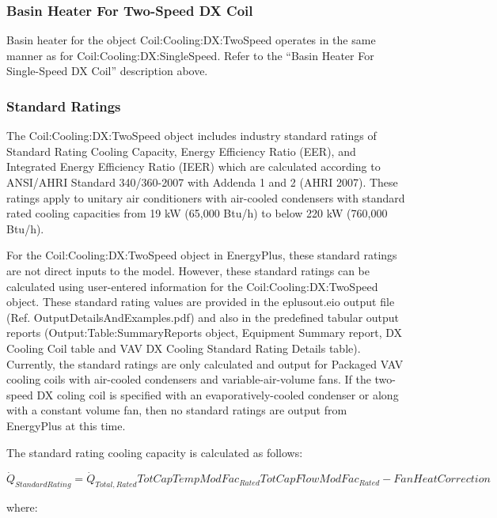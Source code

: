 \subsubsection{Basin Heater For Two-Speed DX Coil}\label{basin-heater-for-two-speed-dx-coil}

Basin heater for the object Coil:Cooling:DX:TwoSpeed operates in the same manner as for Coil:Cooling:DX:SingleSpeed. Refer to the ``Basin Heater For Single-Speed DX Coil'' description above.

\subsubsection{Standard Ratings}\label{standard-ratings}

The Coil:Cooling:DX:TwoSpeed object includes industry standard ratings of Standard Rating Cooling Capacity, Energy Efficiency Ratio (EER), and Integrated Energy Efficiency Ratio (IEER) which are calculated according to ANSI/AHRI Standard 340/360-2007 with Addenda 1 and 2 (AHRI 2007). These ratings apply to unitary air conditioners with air-cooled condensers with standard rated cooling capacities from 19 kW (65,000 Btu/h) to below 220 kW (760,000 Btu/h).

For the Coil:Cooling:DX:TwoSpeed object in EnergyPlus, these standard ratings are not direct inputs to the model. However, these standard ratings can be calculated using user-entered information for the Coil:Cooling:DX:TwoSpeed object. These standard rating values are provided in the eplusout.eio output file (Ref. OutputDetailsAndExamples.pdf) and also in the predefined tabular output reports (Output:Table:SummaryReports object, Equipment Summary report, DX Cooling Coil table and VAV DX Cooling Standard Rating Details table). Currently, the standard ratings are only calculated and output for Packaged VAV cooling coils with air-cooled condensers and variable-air-volume fans. If the two-speed DX coling coil is specified with an evaporatively-cooled condenser or along with a constant volume fan, then no standard ratings are output from EnergyPlus at this time.

The standard rating cooling capacity is calculated as follows:

\begin{equation}
\dot{Q}_{StandardRating} = \dot{Q}_{Total,Rated} TotCapTempModFac_{Rated} TotCapFlowModFac_{Rated} - FanHeatCorrection
\end{equation}

where:

